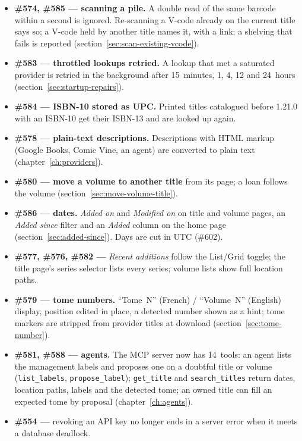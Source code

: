\begin{itemize}
  \item \textbf{\#574, \#585 \string— scanning a pile.} A double read
        of the same barcode within a second is ignored. Re-scanning a
        V-code already on the current title says so; a V-code held by
        another title names it, with a link; a shelving that fails is
        reported (section~\ref{sec:scan-existing-vcode}).
  \item \textbf{\#583 \string— throttled lookups retried.} A lookup
        that met a saturated provider is retried in the background
        after 15~minutes, 1, 4, 12 and 24~hours
        (section~\ref{sec:startup-repairs}).
  \item \textbf{\#584 \string— ISBN-10 stored as UPC.} Printed titles
        catalogued before 1.21.0 with an ISBN-10 get their ISBN-13 and
        are looked up again.
  \item \textbf{\#578 \string— plain-text descriptions.} Descriptions
        with HTML markup (Google Books, Comic Vine, an agent) are
        converted to plain text (chapter~\ref{ch:providers}).
  \item \textbf{\#580 \string— move a volume to another title} from its
        page; a loan follows the volume
        (section~\ref{sec:move-volume-title}).
  \item \textbf{\#586 \string— dates.} \emph{Added on} and
        \emph{Modified on} on title and volume pages, an \emph{Added
        since} filter and an \emph{Added} column on the home page
        (section~\ref{sec:added-since}). Days are cut in UTC (\#602).
  \item \textbf{\#577, \#576, \#582 \string—} \emph{Recent additions}
        follow the List/Grid toggle; the title page's series selector
        lists every series; volume lists show full location paths.
  \item \textbf{\#579 \string— tome numbers.} ``Tome~N'' (French) /
        ``Volume~N'' (English) display, position edited in place, a
        detected number shown as a hint; tome markers are stripped
        from provider titles at download
        (section~\ref{sec:tome-number}).
  \item \textbf{\#581, \#588 \string— agents.} The MCP server now has
        14~tools: an agent lists the management labels and proposes one
        on a doubtful title or volume (\texttt{list\_labels},
        \texttt{propose\_label}); \texttt{get\_title} and
        \texttt{search\_titles} return dates, location paths, labels
        and the detected tome; an owned title can fill an expected tome
        by proposal (chapter~\ref{ch:agents}).
  \item \textbf{\#554 \string—} revoking an API key no longer ends in a
        server error when it meets a database deadlock.
\end{itemize}

